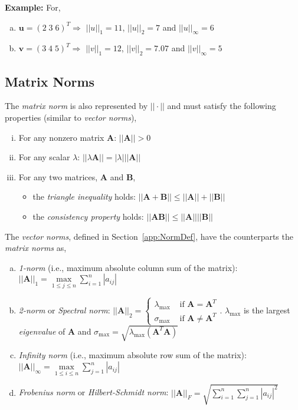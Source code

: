 \documentclass[12pts,a4paper,amsmath,amssymb,floatfix]{article}%
\renewcommand\leq{\leqslant}
\begin{document}
\noindent
{\bf Example:} For,
\begin{enumerate}[(a)]
\item $\bm{u}=\left(2\;3\;6\right)^{T} \Longrightarrow$ $||u||_{1}=11$, $||u||_{2}=7$ and $||u||_{\infty}=6$
\item $\bm{v}=\left(3\;4\;5\right)^{T} \Longrightarrow$ $||v||_{1}=12$, $||v||_{2}=7.07$ and $||v||_{\infty}=5$
\end{enumerate}

\subsection{Matrix Norms}\label{app:MatDef}
The {\it matrix norm} is also represented by $||\cdot||$ and must satisfy the following properties (similar to {\it vector norms}),
\begin{enumerate}[(i)]
\item For any nonzero matrix $\bm{A}$: $||\bm{A}||>0$
\item For any scalar $\lambda$: $||\lambda\bm{A}||=|\lambda| ||\bm{A}||$
\item For any two matrices, $\bm{A}$ and $\bm{B}$, 
\begin{itemize}
\item the {\it triangle inequality} holds: $||\bm{A}+\bm{B}||\leq||\bm{A}||+||\bm{B}||$
\item the {\it consistency property} holds: $||\bm{A}\bm{B}||\leq ||\bm{A}|| ||\bm{B}||$
\end{itemize}
\end{enumerate}
The {\it vector norms}, defined in Section~\ref{app:NormDef}, have the counterparts the {\it matrix norms} as,
\begin{enumerate}[(a)]
\item {\it 1-norm} (i.e., maximum absolute column sum of the matrix): $\left|\left|\bm{A}\right|\right|_{1}=\displaystyle\max\limits_{1\leq j\leq n}\sum\limits_{i=1}^{n}\left|a_{ij}\right|$
\item {\it 2-norm} or {\it Spectral norm}: $\left|\left|\bm{A}\right|\right|_{2}=\begin{cases}\lambda_{\text{max}} & \mbox{ if } \bm{A}=\bm{A}^{T} \\ \sigma_{\text{max}} & \mbox{ if } \bm{A}\neq\bm{A}^{T}\end{cases}$. $\lambda_{\text{max}}$ is the largest {\it eigenvalue} of $\bm{A}$ and $\sigma_{\text{max}}=\sqrt{\lambda_{\text{max}}\left(\bm{A}^{T}\bm{A}\right)}$
\item {\it Infinity norm} (i.e., maximum absolute row sum of the matrix): $\left|\left|\bm{A}\right|\right|_{\infty}=\displaystyle\max\limits_{1\leq i\leq n}\sum\limits_{j=1}^{n}\left|a_{ij}\right|$
\item {\it Frobenius norm} or {\it Hilbert-Schmidt norm}: $\left|\left|\bm{A}\right|\right|_{F}=\sqrt{\sum\limits_{i=1}^{n}\sum\limits_{j=1}^{n}\left|a_{ij}\right|^{2}}$
\end{enumerate}   
\end{document}
